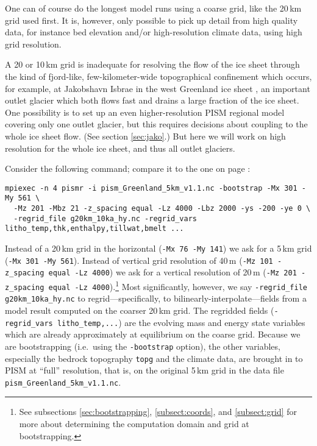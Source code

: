 One can of course do the longest model runs using a coarse grid, like the 20\,km grid used first.  It is, however, only possible to pick up detail from high quality data, for instance bed elevation and/or high-resolution climate data, using high grid resolution.

A 20 or 10\,km grid is inadequate for resolving the flow of the ice sheet through the kind of fjord-like, few-kilometer-wide topographical confinement which occurs, for example, at Jakobshavn Isbrae in the west Greenland ice sheet \cite{Joughinetal08}, an important outlet glacier which both flows fast and drains a large fraction of the ice sheet.  One possibility is to set up an even higher-resolution PISM regional model covering only one outlet glacier, but this requires decisions about coupling to the whole ice sheet flow.  (See section \ref{sec:jako}.)  But here we will work on high resolution for the whole ice sheet, and thus all outlet glaciers.

Consider the following command; compare it to the one on page \pageref{firstcommand}:
\begin{verbatim}
mpiexec -n 4 pismr -i pism_Greenland_5km_v1.1.nc -bootstrap -Mx 301 -My 561 \
  -Mz 201 -Mbz 21 -z_spacing equal -Lz 4000 -Lbz 2000 -ys -200 -ye 0 \
  -regrid_file g20km_10ka_hy.nc -regrid_vars litho_temp,thk,enthalpy,tillwat,bmelt ...
\end{verbatim}
Instead of a 20\,km grid in the horizontal (\verb|-Mx 76 -My 141|) we ask for a 5\,km grid (\verb|-Mx 301 -My 561|).  Instead of vertical grid resolution of 40\,m (\verb|-Mz 101 -z_spacing equal -Lz 4000|) we ask for a vertical resolution of 20\,m (\verb|-Mz 201 -z_spacing equal -Lz 4000|).\footnote{See subsections \ref{sec:bootstrapping}, \ref{subsect:coords}, and \ref{subsect:grid} for more about determining the computation domain and grid at bootstrapping.}  Most significantly, however, we say \verb|-regrid_file g20km_10ka_hy.nc| to regrid---specifically, to bilinearly-interpolate---fields from a model result computed on the coarser 20\,km grid.  The regridded fields (\verb|-regrid_vars litho_temp,...|) are the evolving mass and energy state variables which are already approximately at equilibrium on the coarse grid.  Because we are bootstrapping (i.e.~using the \texttt{-bootstrap} option), the other variables, especially the bedrock topography \verb|topg| and the climate data, are brought in to PISM at ``full'' resolution, that is, on the original 5\,km grid in the data file \texttt{pism_Greenland_5km_v1.1.nc}.

